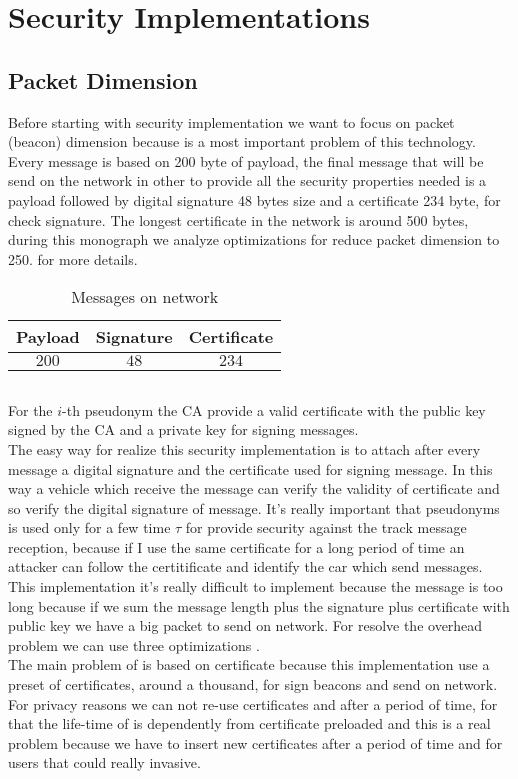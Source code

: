\section{Security Implementations}
\subsection{Packet Dimension}\label{sec:PacketDimension}
Before starting with security implementation we want to focus on packet (beacon) dimension because is a most important problem of this technology. Every message is based on 200 byte of payload, the final message that will be send on the  network in other to provide all the security properties needed is a payload followed by digital signature 48 bytes size and a certificate 234 byte, for check signature. The longest certificate in the network is around 500 bytes, during this monograph we analyze optimizations for reduce packet dimension to 250.
\pageref{tab:CryptographyOverhead} for more details.
\begin{table}[!ht]
	\centering
	\caption{Messages on network}
	\begin{tabular}{|c|c|c|}
	\hline\hline 
	\textbf{Payload} & \textbf{Signature} & \textbf{Certificate}\\
	\hline
	$200$ &	$48$ & $234$\\
	\hline
	\hline     %
 	\end{tabular} 
	\label{tab:MessagesOnNetwork}
\end{table}
\subsection{\baseline}
For the $i$-th pseudonym the CA provide a valid certificate with the public key signed by the CA and a private key for signing messages.\\
The easy way for realize this security implementation is to attach after every message a digital signature and the certificate used for signing message. In this way a vehicle which receive the message can verify the validity of certificate and so verify the digital signature of message. It's really important that pseudonyms is used only for a few time $\tau$ for provide security against the track message reception, because if I use the same certificate for a long period of time an attacker can follow the certitificate and identify the car which send messages. This implementation it's really difficult to implement because the message is too long because if we sum the message length plus the signature plus certificate with public key we have a big packet to send on network. For resolve the overhead problem we can use three optimizations \cite{calandriello}.\\
The main problem of \baseline is based on certificate because this implementation use a preset of certificates, around a thousand, for sign beacons and send on network. For privacy reasons we can not re-use certificates and after a period of time, for that the life-time of \baseline is dependently from certificate preloaded and this is a real problem because we have to insert new certificates after a period of time and for users that could really invasive.